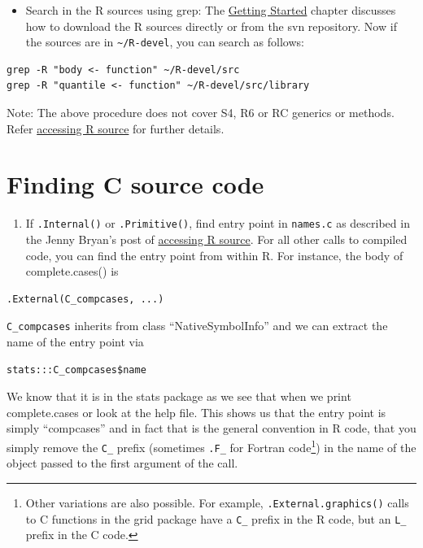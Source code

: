 \documentclass[
]{book}
\providecommand{\tightlist}{%
  \setlength{\itemsep}{0pt}\setlength{\parskip}{0pt}}
\begin{document}
\begin{itemize}
\tightlist
\item
  Search in the R sources using grep: The \hyperref[GetStart]{Getting Started} chapter discusses how to download the R sources directly or from the svn repository. Now if the sources are in \texttt{\textasciitilde{}/R-devel}, you can search as follows:
\end{itemize}

\begin{verbatim}
grep -R "body <- function" ~/R-devel/src
grep -R "quantile <- function" ~/R-devel/src/library
\end{verbatim}

Note: The above procedure does not cover S4, R6 or RC generics or methods. Refer \href{https://github.com/jennybc/access-r-source}{accessing R source} for further details.

\section{Finding C source code}\label{finding-c-source-code}

\begin{enumerate}
\def\labelenumi{\arabic{enumi}.}
\tightlist
\item
  If \texttt{.Internal()} or \texttt{.Primitive()}, find entry point in \texttt{names.c} as described in the Jenny Bryan's post of \href{https://github.com/jennybc/access-r-source}{accessing R source}. For all other calls to compiled code, you can find the entry point from within R. For instance, the body of complete.cases() is
\end{enumerate}

\begin{verbatim}
.External(C_compcases, ...)
\end{verbatim}

\texttt{C\_compcases} inherits from class ``NativeSymbolInfo'' and we can extract the name of the entry point via

\begin{verbatim}
stats:::C_compcases$name
\end{verbatim}

We know that it is in the stats package as we see that when we print complete.cases or look at the help file. This shows us that the entry point is simply ``compcases'' and in fact that is the general convention in R code, that you simply remove the \texttt{C\_} prefix (sometimes \texttt{.F\_} for Fortran code\footnote{Other variations are also possible. For example, \texttt{.External.graphics()} calls to C functions in the grid package have a \texttt{C\_} prefix in the R code, but an \texttt{L\_} prefix in the C code.}) in the name of the object passed to the first argument of the call.
\end{document}
